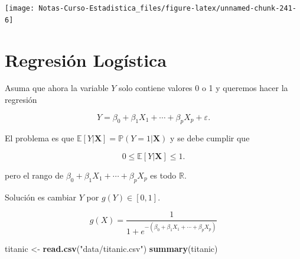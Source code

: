 \documentclass[
  12pt,
]{book}
\newenvironment{Shaded}{\begin{snugshade}}{\end{snugshade}}
\newcommand{\KeywordTok}[1]{\textcolor[rgb]{0.13,0.29,0.53}{\textbf{#1}}}
\newcommand{\NormalTok}[1]{#1}
\newcommand{\StringTok}[1]{\textcolor[rgb]{0.31,0.60,0.02}{#1}}
\theoremstyle{definition}
\theoremstyle{definition}
\theoremstyle{definition}
\theoremstyle{remark}
\begin{document}
\begin{center}\texttt{[image: Notas-Curso-Estadistica\_files/figure-latex/unnamed-chunk-241-6]} \end{center}

\hypertarget{regresiuxf3n-loguxedstica}{%
\chapter{Regresión Logística}\label{regresiuxf3n-loguxedstica}}

Asuma que ahora la variable \(Y\) solo contiene valores 0 o 1 y queremos hacer la regresión

\begin{equation*}
Y = \beta_{0} +\beta_{1} X_{1} + \cdots + \beta_{p} X_{p} + \varepsilon.
\end{equation*}

El problema es que \(\mathbb{E}\left[Y | \boldsymbol{X}\right] = \mathbb{P}\left(Y=1\vert \boldsymbol{X}\right)\) y se debe cumplir que

\begin{equation*}
0\leq \mathbb{E}\left[Y | \boldsymbol{X}\right]\leq 1.
\end{equation*}

pero el rango de \(\beta_{0} +\beta_{1} X_{1} + \cdots + \beta_{p} X_{p}\) es todo \(\mathbb{R}\).

Solución es cambiar \(Y\) por \(g(Y)\in [0,1]\).

\begin{equation*}
g(X) = \frac{1}{1+e^{-(\beta_{0} +\beta_{1} X_{1} + \cdots + \beta_{p} X_{p})}}
\end{equation*}

\begin{Shaded}
\begin{Highlighting}[]
\NormalTok{titanic <-}\StringTok{ }\KeywordTok{read.csv}\NormalTok{(}\StringTok{"data/titanic.csv"}\NormalTok{)}
\KeywordTok{summary}\NormalTok{(titanic)}
\end{Highlighting}
\end{Shaded}
\end{document}
